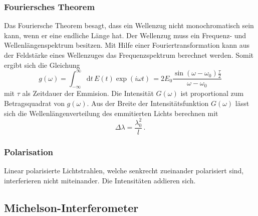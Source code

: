 \subsubsection{Fouriersches Theorem} %
\label{sec:Fouriersches Theorem}

Das Fouriersche Theorem besagt, dass ein Wellenzug nicht monochromatisch sein kann, wenn er eine endliche Länge hat.
Der Wellenzug muss ein Frequenz- und Wellenlängenspektrum besitzen.
Mit Hilfe einer Fouriertransformation kann aus der Feldstärke eines Wellenzuges das Frequenzspektrum berechnet werden.
Somit ergibt sich die Gleichung
\begin{equation*}
    g\left(ω\right) = \int_{-\infty}^{\infty}\text{d}t\, E\left(t\right) \exp{\left(iωt\right)}\,
    = 2 E_0 \frac{\sin{(ω - ω_0)}\frac{τ}{2}}{ω - ω_0}
\end{equation*}
mit $τ$ als Zeitdauer der Emmision.
Die Intensität $G(ω)$ ist proportional zum Betragsquadrat von $g(ω)$.
Aus der Breite der Intensitätsfunktion $G(ω)$ lässt sich die Wellenlängenverteilung des emmitierten Lichts berechnen mit
\begin{equation*}
    Δλ = \frac{λ_0^2}{l}\, .
\end{equation*}

\subsubsection{Polarisation}
\label{sec:Polarisation}

Linear polarisierte Lichtstrahlen, welche senkrecht zueinander polarisiert sind, 
interferieren nicht miteinander. Die Intensitäten addieren sich.

\subsection{Michelson-Interferometer}
\label{sec:Michelson-Interferometer}

